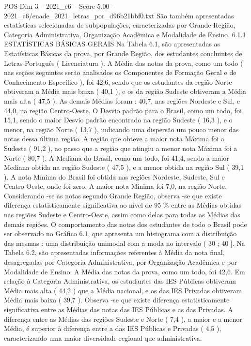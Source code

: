 \begin{textsample}{POS Dim 3 – 2021\_c6 – Score 5.00 – 2021\_c6/enade\_2021\_letras\_por\_d96b21bbf0.txt}
São também apresentadas estatísticas selecionadas de subpopulações, caracterizadas por Grande Região, Categoria Administrativa, Organização Acadêmica e Modalidade de Ensino. 6.1.1 ESTATÍSTICAS BÁSICAS GERAIS Na Tabela 6.1, são apresentadas as Estatísticas Básicas da prova, por Grande Região, dos estudantes concluintes de Letras-Português ( Licenciatura ).
A Média das notas da prova, como um todo ( nas seções seguintes serão analisados os Componentes de Formação Geral e de Conhecimento Específico ), foi 42,6, sendo que os estudantes da região Norte obtiveram a Média mais baixa ( 40,1 ), e os da região Sudeste obtiveram a Média mais alta ( 47,5 ).
As demais Médias foram : 40,7, nas regiões Nordeste e Sul, e 44,0, na região Centro-Oeste.
O Desvio padrão para o Brasil, como um todo, foi 15,1, sendo o maior Desvio padrão encontrado na região Sudeste ( 16,3 ), e o menor, na região Norte ( 13,7 ), indicando uma dispersão um pouco menor das notas dessa última região.
A região que obteve a maior nota Máxima foi a Sudeste ( 91,2 ), ao passo que a região que atingiu a menor nota Máxima foi a Norte ( 80,7 ).
A Mediana do Brasil, como um todo, foi 41,4, sendo a maior Mediana obtida na região Sudeste ( 47,5 ), e a menor obtida na região Sul ( 39,1 ).
A nota Mínima do Brasil foi obtida nas regiões Nordeste, Sudeste, Sul e Centro-Oeste, onde foi zero.
A maior nota Mínima foi 7,0, na região Norte.
Considerando -se as notas segundo Grande Região, observa -se que existe diferença estatisticamente significativa ao nível de 95 \% entre as Médias obtidas nas regiões Sudeste e Centro-Oeste, assim como delas para todas as Médias das demais regiões.
O comportamento das notas dos estudantes de todo o Brasil pode ser observado no Gráfico 6.1, que apresenta um histograma com a distribuição das mesmas : uma distribuição unimodal com a moda no intervalo ( 30 ; 40 ].
Na Tabela 6.2, são apresentadas informações referentes à Média da nota final, desagregadas por Categoria Administrativa, por Organização Acadêmica e por Modalidade de Ensino.
A Média das notas da prova, como um todo, foi 42,6.
Em relação à Categoria Administrativa, os estudantes das IES Públicas obtiveram Média mais alta ( 44,2 ) que a Média nacional, e os das IES Privadas obtiveram Média mais baixa ( 39,7 ).
Observa -se que existe diferença estatisticamente significativa entre as Médias das notas das IES Públicas e as das Privadas.
A diferença entre as Médias das regiões Sudeste e Norte ( 7,4 ), a maior e a menor Média, é superior à diferença entre a das IES Públicas e Privadas ( 4,5 ), caracterizando uma maior diversidade regional que administrativa.

\end{textsample}

